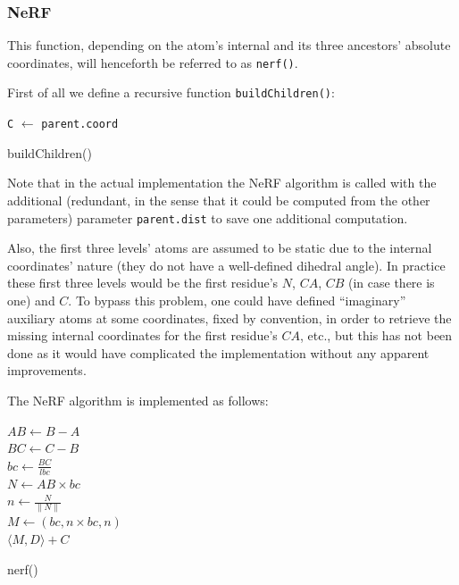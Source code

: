 \documentclass[12pt]{article}
\theoremstyle{definition}\newtheorem*{definition}{Definition}
\theoremstyle{definition}\newtheorem*{remark}{Remark}
\begin{document}
\subsubsection{NeRF}\label{subsubsec:nerf}
This function, depending on the atom's internal and its three ancestors' absolute coordinates, will henceforth be referred to as \texttt{nerf()}.

First of all we define a recursive function \texttt{buildChildren()}:

\begin{algorithm}[H]
 
 	\texttt{C} $\leftarrow$ \texttt{parent.coord}\;
	\caption{buildChildren()}
\end{algorithm}

Note that in the actual implementation the NeRF algorithm is called with the additional (redundant, in the sense that it could be computed from the other parameters) parameter \texttt{parent.dist} to save one additional computation.

Also, the first three levels' atoms are assumed to be static due to the internal coordinates' nature (they do not have a well-defined dihedral angle). In practice these first three levels would be the first residue's $N$, $CA$, $CB$ (in case there is one) and $C$.
To bypass this problem, one could have defined ``imaginary'' auxiliary atoms at some coordinates, fixed by convention, in order to retrieve the missing internal coordinates for the first residue's $CA$, etc., but this has not been done as it would have complicated the implementation without any apparent improvements.

The NeRF algorithm is implemented as follows:

\begin{algorithm}[H]
 	
 	$AB \leftarrow B-A$\\
 	$BC \leftarrow C-B$\\
 	$bc \leftarrow \frac{BC}{lbc}$\\
 	$N  \leftarrow AB\times bc$\\
 	$n  \leftarrow \frac{N}{\|N\|}$\\
 	$M  \leftarrow (bc,n\times bc,n)$\\
 	
 	\Return $\langle M,D\rangle+C$
 	
	\caption{nerf()}
\end{algorithm}
\end{document}
